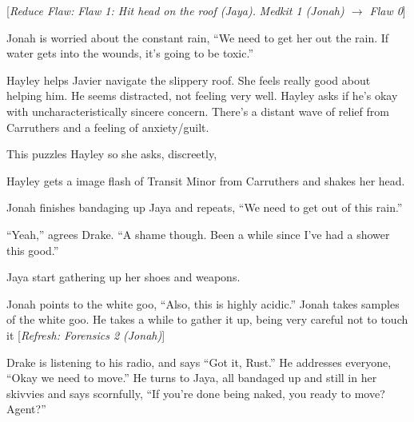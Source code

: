 {[}\textit{Reduce Flaw: }\textit{ {\color[RGB]{255,0,0}Flaw 1: Hit head on the roof (Jaya).} }\textit{  Medkit 1 (Jonah) $\rightarrow$ Flaw 0}{]}

Jonah is worried about the constant rain, ``We need to get her out the rain.  If water gets into the wounds, it's going to be toxic.''



Hayley helps Javier navigate the slippery roof.  She feels really good about helping him.  He seems distracted, not feeling very well.  Hayley asks if he's okay with uncharacteristically sincere concern.  There's a distant wave of relief from Carruthers and a feeling of anxiety/guilt.

This puzzles Hayley so she asks, discreetly,    {\color[RGB]{255,153,0} } 


Hayley gets a image flash of Transit Minor from Carruthers and shakes her head.     {\color[RGB]{255,153,0} } 


   {\color[RGB]{255,153,0} } 




Jonah finishes bandaging up Jaya and repeats, ``We need to get out of this rain.''

``Yeah,'' agrees Drake.  ``A shame though.  Been a while since I've had a shower this good.''

Jaya start gathering up her shoes and weapons.

Jonah points to the white goo, ``Also, this is highly acidic.''  Jonah takes samples of the white goo.  He takes a while to gather it up, being very careful not to touch it {[}\textit{Refresh: Forensics 2 (Jonah)}{]}

Drake is listening to his radio, and says ``Got it, Rust.''  He addresses everyone, ``Okay we need to move.''  He turns to Jaya, all bandaged up and still in her skivvies and says scornfully, ``If you're done being naked, you ready to move?  Agent?''



